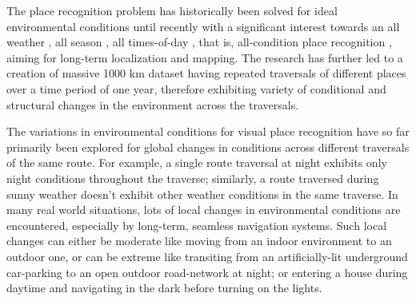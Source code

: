 \documentclass[letterpaper, 10 pt, conference]{ieeeconf}  %
\begin{document}

The place recognition problem has historically been solved for ideal environmental conditions \cite{thompson1993vision,Cummins2009} until recently with a significant interest towards an all weather \cite{linegar2016made}, all season \cite{McManus2015,chen2017deep}, all times-of-day \cite{linegar2015work}, that is,  all-condition place recognition \cite{Milford2012},  aiming for long-term localization and mapping. The research has further led to a creation of massive 1000 km dataset \cite{maddern20161} having repeated traversals of different places over a time period of one year, therefore exhibiting variety of conditional and structural changes in the environment across the traversals.

The variations in environmental conditions for visual place recognition have so far primarily been explored for global changes in conditions across different traversals of the same route. For example, a single route traversal at night exhibits only night conditions throughout the traverse; similarly, a route traversed during sunny weather doesn't exhibit other weather conditions in the same traverse. In many real world situations, lots of local changes in environmental conditions are encountered, especially by long-term, seamless navigation systems. Such local changes can either be moderate like moving from an indoor environment to an outdoor one, or can be extreme like transiting from an artificially-lit underground car-parking to an open outdoor road-network at night; or entering a house during daytime and navigating in the dark before turning on the lights.  
\end{document}
